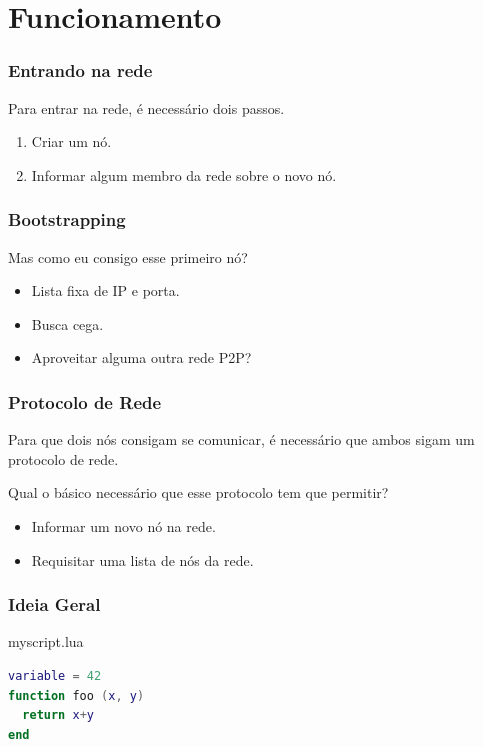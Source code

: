 \documentclass[brazil]{beamer}
\begin{document}
\section{Funcionamento}
\begin{frame}
  \frametitle{Entrando na rede}
  Para entrar na rede, é necessário dois passos.
  \pause
  \begin{enumerate}
    \item Criar um nó.
    \pause
    \item Informar algum membro da rede sobre o novo nó.
  \end{enumerate}
\end{frame}
\begin{frame}
  \frametitle{Bootstrapping}
  
  Mas como eu consigo esse primeiro nó?
  \vspace{20pt}
  \pause
  \begin{itemize}
    \item Lista fixa de IP e porta.
    \pause
    \item Busca cega.
    \pause
    \item Aproveitar alguma outra rede P2P?
  \end{itemize}
\end{frame}
\begin{frame}
  \frametitle{Protocolo de Rede}
  
  Para que dois nós consigam se comunicar, é necessário que ambos sigam um protocolo de rede.
  
  \vspace{20pt}
  \pause
  
  Qual o básico necessário que esse protocolo tem que permitir?
  \begin{itemize}
    \pause
    \item Informar um novo nó na rede.
    \pause
    \item Requisitar uma lista de nós da rede.
  \end{itemize}
\end{frame}
\begin{frame}[fragile]
  \frametitle{Ideia Geral}
  \pause
  \begin{block}{myscript.lua}
    \begin{lstlisting}[language=lua]
variable = 42
function foo (x, y)
  return x+y
end
    \end{lstlisting}
  \end{block}
\end{frame}
\end{document}
